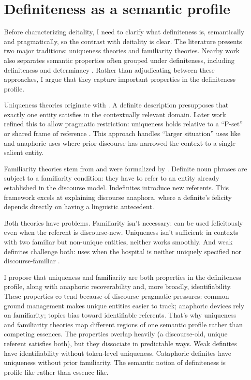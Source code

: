 \documentclass[12pt,letterpaper]{article}
\begin{document}
\section{Definiteness as a semantic profile}\label{sec:semantic}

Before characterizing deitality, I need to clarify what definiteness is, semantically and pragmatically, so the contrast with deitality is clear. The literature presents two major traditions: uniqueness theories and familiarity theories. Nearby work also separates semantic properties often grouped under definiteness, including definiteness and determinacy \parencite{coppockBeaver2015}. Rather than adjudicating between these approaches, I argue that they capture important properties in the definiteness profile.

Uniqueness theories originate with \textcite{russell1905}. A definite description  presupposes that exactly one entity satisfies  in the contextually relevant domain. Later work refined this to allow pragmatic restriction: uniqueness holds relative to a \enquote{P-set} or shared frame of reference \parencite{hawkins1978}. This approach handles \enquote{larger situation} uses like  and anaphoric uses where prior discourse has narrowed the context to a single salient entity.

Familiarity theories stem from \textcite{christophersen1939} and were formalized by \textcite{heim1982}. Definite noun phrases are subject to a familiarity condition: they have to refer to an entity already established in the discourse model. Indefinites introduce new referents. This framework excels at explaining discourse anaphora, where a definite's felicity depends directly on having a linguistic antecedent.

Both theories have problems. Familiarity isn't necessary:  can be used felicitously even when the referent is discourse-new. Uniqueness isn't sufficient: in contexts with two familiar but non-unique entities, neither  works smoothly. And weak definites challenge both:  uses  when the hospital is neither uniquely specified nor discourse-familiar \parencite{Abbott2004,Birner2013}.

I propose that uniqueness and familiarity are both properties in the definiteness profile, along with anaphoric recoverability and, more broadly, identifiability. These properties co-tend because of discourse-pragmatic pressures: common ground management makes unique entities easier to track; anaphoric devices rely on familiarity; topics bias toward identifiable referents. That's why uniqueness and familiarity theories map different regions of one semantic profile rather than competing essences. The properties overlap heavily (a discourse-old, unique referent satisfies both), but they dissociate in predictable ways. Weak definites have identifiability without token-level uniqueness. Cataphoric definites have uniqueness without prior familiarity. The semantic notion of definiteness is profile-like rather than essence-like.
\end{document}
